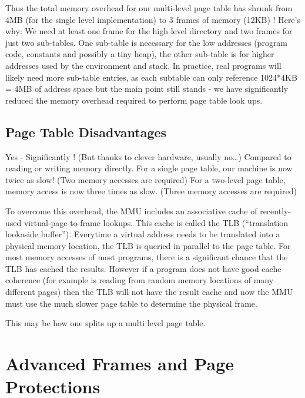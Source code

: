  Thus the total memory overhead for our multi-level page table has shrunk from 4MB (for the single level implementation) to 3 frames of memory (12KB) ! Here's why: We need at least one frame for the high level directory and two frames for just two sub-tables. One sub-table is necessary for the low addresses (program code, constants and possibly a tiny heap), the other sub-table is for higher addresses used by the environment and stack. In practice, real programs will likely need more sub-table entries, as each subtable can only reference 1024*4KB = 4MB of address space but the main point still stands - we have significantly reduced the memory overhead required to perform page table look ups.

\subsection{Page Table Disadvantages}
 Yes - Significantly ! (But thanks to clever hardware, usually no\ldots{}) Compared to reading or writing memory directly. For a single page table, our machine is now twice as slow! (Two memory accesses are required) For a two-level page table, memory access is now three times as slow. (Three memory accesses are required)

 To overcome this overhead, the MMU includes an associative cache of recently-used virtual-page-to-frame lookups. This cache is called the TLB (``translation lookaside buffer''). Everytime a virtual address needs to be translated into a physical memory location, the TLB is queried in parallel to the page table. For most memory accesses of most programs, there is a significant chance that the TLB has cached the results. However if a program does not have good cache coherence (for example is reading from random memory locations of many different pages) then the TLB will not have the result cache and now the MMU must use the much slower page table to determine the physical frame.

\begin{wrapfig}
\end{wrapfig}

This may be how one splits up a multi level page table.

\section{Advanced Frames and Page Protections}\label{advanced-frames-and-page-protections}

